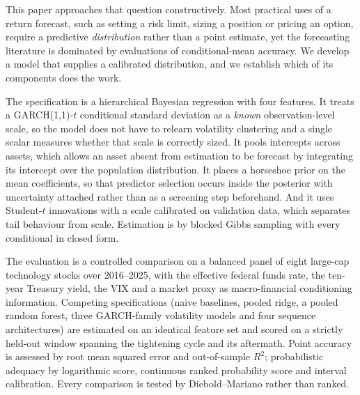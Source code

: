 This paper approaches that question constructively. Most practical uses of a
return forecast, such as setting a risk limit, sizing a position or pricing
an option, require a predictive \emph{distribution} rather than a point estimate,
yet the forecasting literature is dominated by evaluations of conditional-mean
accuracy. We develop a model that supplies a calibrated distribution, and we
establish which of its components does the work.

The specification is a hierarchical Bayesian regression with four features. It
treats a GARCH(1,1)-$t$ conditional standard deviation as a \emph{known}
observation-level scale, so the model does not have to relearn volatility
clustering and a single scalar measures whether that scale is correctly sized.
It pools intercepts across assets, which allows an asset absent from estimation
to be forecast by integrating its intercept over the population distribution. It
places a horseshoe prior \citep{carvalho2010horseshoe} on the mean coefficients,
so that predictor selection occurs inside the posterior with uncertainty
attached rather than as a screening step beforehand. And it uses Student-$t$
innovations with a scale calibrated on validation data, which separates
tail behaviour from scale. Estimation is by blocked Gibbs sampling with every
conditional in closed form.

The evaluation is a controlled comparison on a balanced panel of eight large-cap
technology stocks over 2016--2025, with the effective federal funds rate, the
ten-year Treasury yield, the VIX and a market proxy as macro-financial
conditioning information. Competing specifications (naive baselines, pooled
ridge, a pooled random forest, three GARCH-family volatility models and four
sequence architectures) are estimated on an identical feature set and scored on
a strictly held-out window spanning the tightening cycle and its aftermath.
Point accuracy is assessed by root mean squared error and out-of-sample $R^2$;
probabilistic adequacy by logarithmic score, continuous ranked probability score
and interval calibration. Every comparison is tested by Diebold--Mariano rather
than ranked.

